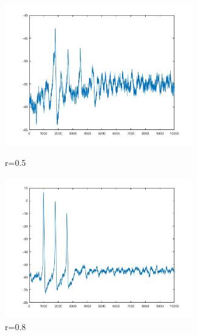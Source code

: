 \documentclass[
    bachelor,
    nofont, %
    pdflinks,
    ]{xjtuthesis}
\begin{document}
\begin{figure}
\begin{minipage}[!ht]{0.5\linewidth}
\centering
\includegraphics[width=3.2in]{p10r0_5_2.jpg}
\caption{r=0.5}
\end{minipage}%
\begin{minipage}[!ht]{0.5\linewidth}
\centering
\includegraphics[width=3.2in]{p10r0_8_2.jpg}
\caption{r=0.8}
\end{minipage}
\end{figure}
\end{document}
